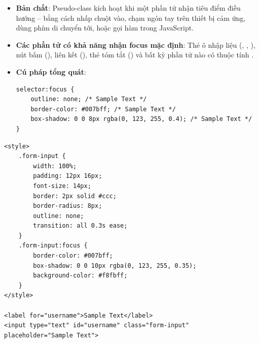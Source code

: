 \begin{conceptBox}
\begin{itemize}[leftmargin=1.5em, itemsep=3pt, parsep=0pt]
    \item \textbf{Bản chất}: Pseudo-class  kích hoạt khi một phần tử nhận tiêu điểm điều hướng -- bằng cách nhấp chuột vào, chạm ngón tay trên thiết bị cảm ứng, dùng phím  di chuyển tới, hoặc gọi hàm  trong JavaScript.
    \item \textbf{Các phần tử có khả năng nhận focus mặc định}: Thẻ ô nhập liệu (, , ), nút bấm (), liên kết (), thẻ tóm tắt () và bất kỳ phần tử nào có thuộc tính .
    \item \textbf{Cú pháp tổng quát}:
    \begin{codeWindow}
\begin{lstlisting}[language=CSS3]
selector:focus {
    outline: none; /* Sample Text */
    border-color: #007bff; /* Sample Text */
    box-shadow: 0 0 8px rgba(0, 123, 255, 0.4); /* Sample Text */
}
\end{lstlisting}
    \end{codeWindow}
\end{itemize}
\end{conceptBox}

\begin{conceptBox}
\begin{codeWindow}
\begin{lstlisting}[language=HTML5]
<style>
    .form-input {
        width: 100%;
        padding: 12px 16px;
        font-size: 14px;
        border: 2px solid #ccc;
        border-radius: 8px;
        outline: none;
        transition: all 0.3s ease;
    }
    .form-input:focus {
        border-color: #007bff;
        box-shadow: 0 0 10px rgba(0, 123, 255, 0.35);
        background-color: #f8fbff;
    }
</style>

<label for="username">Sample Text</label>
<input type="text" id="username" class="form-input" placeholder="Sample Text">
\end{lstlisting}
\end{codeWindow}
\end{conceptBox}


